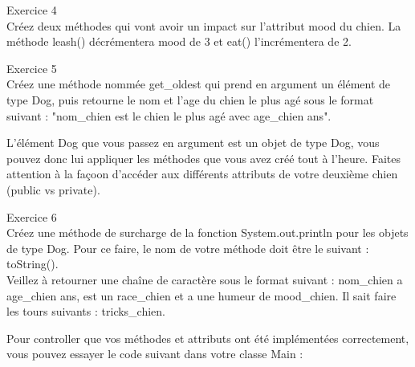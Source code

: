 \begin{Exercice} Exercice 4\\
    Créez deux méthodes qui vont avoir un impact sur l'attribut mood du chien. La méthode leash() décrémentera mood de 3 et eat() l'incrémentera de 2. \\

\begin{solution}
	
\end{solution}
\end{Exercice}

\begin{Exercice} Exercice 5\\
    Créez une méthode nommée get\_oldest qui prend en argument un élément de type Dog, puis retourne le nom et l'age du chien le plus agé sous le format suivant : "nom\_chien est le chien le plus agé avec age\_chien ans". \\
   	
\begin{conseil}
   L'élément Dog que vous passez en argument est un objet de type Dog, vous pouvez donc lui appliquer les méthodes que vous avez créé tout à l'heure.
   Faites attention à la façoon d'accéder aux différents attributs de votre deuxième chien (public vs private).
\end{conseil}
    
\begin{solution}
	
\end{solution}
\end{Exercice}

\begin{Exercice} Exercice 6\\
    Créez une méthode de surcharge de la fonction System.out.println pour les objets de type Dog. Pour ce faire, le nom de votre méthode doit être le suivant : toString(). \\
    Veillez à retourner une chaîne de caractère sous le format suivant : nom\_chien a age\_chien ans, est un race\_chien et a une humeur de mood\_chien. Il sait faire les tours suivants : tricks\_chien.

\begin{solution}
	
\end{solution}
\end{Exercice}

Pour controller que vos méthodes et attributs ont été implémentées correctement, vous pouvez essayer le code suivant dans votre classe Main :

